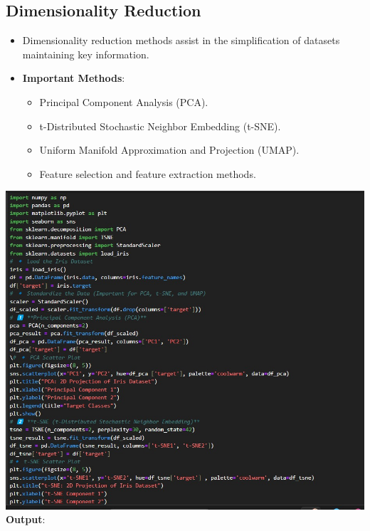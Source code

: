 \documentclass{article}
\begin{document}
\subsection{Dimensionality Reduction}
\begin{itemize}
    \item Dimensionality reduction methods assist in the simplification of datasets maintaining key information. 
    \item \textbf{Important Methods}:
    \begin{itemize}
    \item Principal Component Analysis (PCA).
    \item t-Distributed Stochastic Neighbor Embedding (t-SNE).
    \item Uniform Manifold Approximation and Projection (UMAP).
    \item Feature selection and feature extraction methods.
    \end{itemize}
\end{itemize}
\includegraphics[width=17cm,height=20
cm]{Dimensionality Reduction.jpeg}
\newpage
\textbf{Output}:
\end{document}
